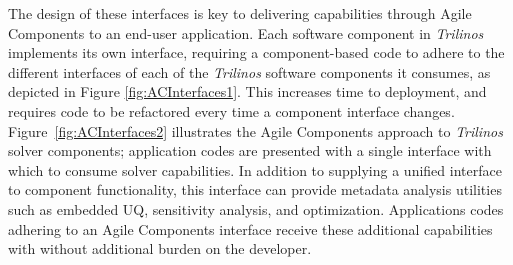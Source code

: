 \documentclass[pdf,ps2pdf,12pt,report]{SANDreport}
\theoremstyle{plain}
\theoremstyle{definition}
\theoremstyle{remark}
\numberwithin{equation}{section}
\begin{document}
The design of these interfaces is key to delivering capabilities through Agile Components to an end-user application. Each software component in \emph{Trilinos} implements its own interface, requiring a component-based code to adhere to the different interfaces of each of the \emph{Trilinos} software components it consumes, as depicted in Figure \ref{fig:ACInterfaces1}.  This increases time to deployment, and requires code to be refactored every time a component interface changes.   Figure~\ref{fig:ACInterfaces2} illustrates the Agile Components approach to \emph{Trilinos} solver components; application codes are presented with a single interface with which to consume solver capabilities.  In addition to supplying a unified interface to component functionality, this interface can provide metadata analysis utilities such as embedded UQ, sensitivity analysis, and optimization.  Applications codes adhering to an Agile Components interface receive these additional capabilities with without additional burden on the developer.
\end{document}
